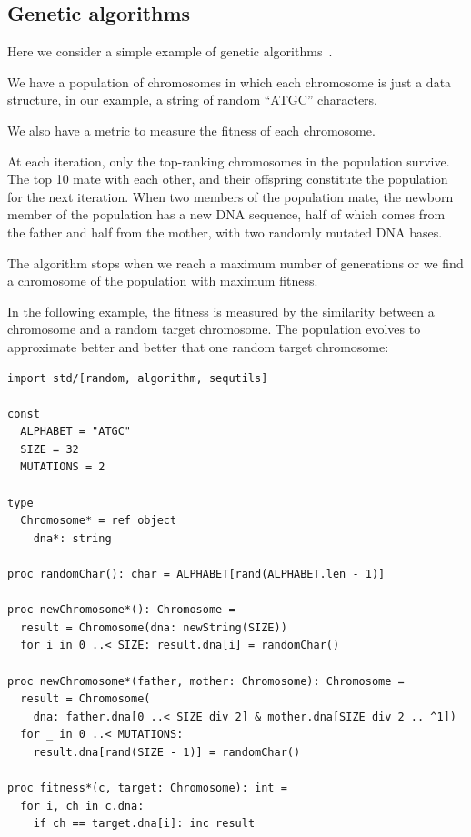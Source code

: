 \documentclass[justified, sixbynine]{tufte-book}
\def\ft{\small\tt}
\theoremstyle{plain}%
\newtheorem * {corollary}{Corollary}
\theoremstyle{definition}
\theoremstyle{remark}
\newtheorem * {remark}{Remark}
\newtheorem * {note}{Note}
\begin{document}
\begin{fullwidth}
\goodbreak\subsection{Genetic algorithms}


Here we consider a simple example of genetic algorithms~\cite{barricelli}.

We have a population of chromosomes in which each chromosome is just a data structure, in our example, a string of random ``ATGC'' characters.

We also have a metric to measure the fitness of each chromosome.

At each iteration, only the top-ranking chromosomes in the population survive. The top 10 mate with each other, and their offspring constitute the population for the next iteration. When two members of the population mate, the newborn member of the population has a new DNA sequence, half of which comes from the father and half from the mother, with two randomly mutated DNA bases.

The algorithm stops when we reach a maximum number of generations or we find a chromosome of the population with maximum fitness.

In the following example, the fitness is measured by the similarity between a chromosome and a random target chromosome. The population evolves to approximate better and better that one random target chromosome:


\begin{lstlisting}[caption={in file: {\ft genetic.nim}}]
import std/[random, algorithm, sequtils]

const
  ALPHABET = "ATGC"
  SIZE = 32
  MUTATIONS = 2

type
  Chromosome* = ref object
    dna*: string

proc randomChar(): char = ALPHABET[rand(ALPHABET.len - 1)]

proc newChromosome*(): Chromosome =
  result = Chromosome(dna: newString(SIZE))
  for i in 0 ..< SIZE: result.dna[i] = randomChar()

proc newChromosome*(father, mother: Chromosome): Chromosome =
  result = Chromosome(
    dna: father.dna[0 ..< SIZE div 2] & mother.dna[SIZE div 2 .. ^1])
  for _ in 0 ..< MUTATIONS:
    result.dna[rand(SIZE - 1)] = randomChar()

proc fitness*(c, target: Chromosome): int =
  for i, ch in c.dna:
    if ch == target.dna[i]: inc result


\end{lstlisting}
\end{fullwidth}
\end{document}
